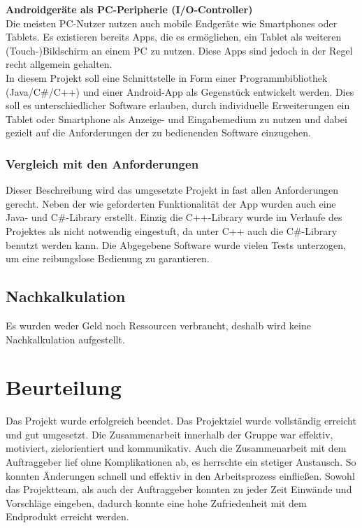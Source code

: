 \documentclass{scrartcl}
\begin{document}
\textbf{Androidgeräte als PC-Peripherie (I/O-Controller)}\\
Die meisten PC-Nutzer nutzen auch mobile Endgeräte wie Smart­phones oder Tablets. Es existieren bereits Apps, die es ermöglichen, ein Tablet als weiteren (Touch-)Bildschirm an einem PC zu nutzen. Diese Apps sind jedoch in der Regel recht allgemein gehalten.\\
In diesem Projekt soll eine Schnittstelle in Form einer Programmbibliothek (Java/C\#/C++) und einer Android-App als Gegenstück entwickelt werden. Dies soll es unterschiedlicher Software erlauben, durch individuelle Erweiterungen ein Tablet oder Smartphone als Anzeige- und Eingabe­medium zu nutzen und dabei gezielt auf die Anforderungen der zu bedienenden Software einzugehen.\\
\subsubsection{Vergleich mit den Anforderungen}
Dieser Beschreibung wird das umgesetzte Projekt in fast allen Anforderungen gerecht. Neben der wie geforderten Funktionalität der App wurden auch eine Java- und C\#-Library erstellt. Einzig die C++-Library wurde im Verlaufe des Projektes als nicht notwendig eingestuft, da unter C++ auch die C\#-Library benutzt werden kann.
Die Abgegebene Software wurde vielen Tests unterzogen, um eine reibungslose Bedienung zu garantieren.

\subsection{Nachkalkulation}
Es wurden weder Geld noch Ressourcen verbraucht, deshalb wird keine Nachkalkulation aufgestellt.

\section{Beurteilung}
Das Projekt wurde erfolgreich beendet. Das Projektziel wurde vollständig erreicht und gut umgesetzt. Die Zusammenarbeit innerhalb der Gruppe war effektiv, motiviert, zielorientiert und kommunikativ. Auch die Zusammenarbeit mit dem Auftraggeber lief ohne Komplikationen ab, es herrschte ein stetiger Austausch. So konnten Änderungen schnell und effektiv in den Arbeitsprozess einfließen. Sowohl das Projektteam, als auch der Auftraggeber konnten zu jeder Zeit Einwände und Vorschläge eingeben, dadurch konnte eine hohe Zufriedenheit mit dem Endprodukt erreicht werden.
\end{document}
